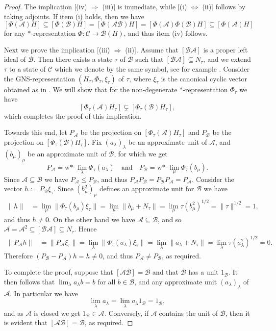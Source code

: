 \documentclass[11pt, draft]{amsart}
\numberwithin{equation}{section}
\theoremstyle{plain}
\theoremstyle{definition}
\theoremstyle{remark}
\newcommand{\A}{{\mathcal{A}}}
\newcommand{\B}{{\mathcal{B}}}
\newcommand{\C}{{\mathcal{C}}}
\def\la{\lambda}
\newcommand{\qand}{\quad\text{and}\quad}
\begin{document}
\begin{proof}
The implication [(iv) $\Rightarrow$ (iii)] is immediate, while [(i) $\Leftrightarrow$ (ii)] follows by taking adjoints.
If item (i) holds, then we have
\[
[\Phi(\A) H] \subseteq [\Phi(\B) H] = [\Phi(\A \B) H] = [\Phi(\A) \Phi(\B) H] \subseteq [\Phi(\A) H]
\]
for any $*$-representation $\Phi \colon \C \to \B(H)$, and thus item (iv) follows. 

Next we prove the implication [(iii) $\Rightarrow$ (ii)]. Assume that $[\B \A]$ is a proper left ideal of $\B$.
Then there exists a state $\tau$ of $\B$ such that $[\B \A] \subseteq N_\tau$, and we extend $\tau$ to a state of $\C$ which we denote by the same symbol, see for example \cite[Theorem 5.3.3 and Theorem 3.3.8]{Mur90}.
Consider the GNS-representation $(H_\tau, \Phi_\tau, \xi_\tau)$ of $\tau$, where $\xi_\tau$ is the canonical cyclic vector obtained as in \cite[Theorem 5.1.1]{Mur90}.
We will show that for the non-degenerate $*$-representation $\Phi_\tau$ we have
\[
[\Phi_\tau(\A) H_\tau] \subsetneq [\Phi_\tau(\B) H_{\tau}],
\]
which completes the proof of this implication.

Towards this end, let $P_\A$ be the projection on $[\Phi_\tau(\A) H_\tau]$ and $P_\B$ be the projection on $[\Phi_\tau(\B) H_\tau]$.
Fix $(a_\la)_\la$ be an approximate unit of $\A$, and $(b_\mu)_\mu$ be an approximate unit of $\B$, for which we get
\[
P_\A = \text{w*-}\lim_\la \Phi_{\tau}(a_\la)
\qand
P_\B = \text{w*-}\lim_\mu \Phi_{\tau}(b_\mu).
\]
Since $\A \subseteq \B$ we have $P_\A \leq P_\B$, and thus $P_\A P_\B = P_\B P_\A = P_\A$.
Consider the vector $h:= P_\B \xi_\tau$.
Since $(b_\mu^2)_\mu$ defines an approximate unit for $\B$ we have
\begin{align*}
\|h\| 
& = \lim_\mu \|\Phi_\tau(b_\mu)\xi_\tau\| 
= \lim_\mu \|b_\mu + N_\tau\| 
= \lim_\mu \tau(b_\mu^2)^{1/2} 
= \|\tau\|^{1/2} = 1,
\end{align*}
and thus $h \neq 0$.
On the other hand we have $\A \subseteq \B$, and so $\A = \A^2 \subseteq [\B \A] \subseteq N_\tau$. 
Hence
\begin{align*}
\|P_\A h\| 
& = \| P_\A \xi_\tau\| 
= \lim_\la \|\Phi_\tau(a_\la) \xi_\tau\| 
= \lim_\la \|a_\la+N_\tau\| 
= \lim_\la \tau(a_\la^2)^{1/2} = 0.
\end{align*}
Therefore $(P_\B - P_\A) h = h \neq 0$, and thus $P_\A \neq P_\B$, as required.

To complete the proof, suppose that $[\A \B] = \B$ and that $\B$ has a unit $1_{\B}$.
It then follows that $\lim_\la a_\la b = b$ for all $b \in \B$, and any approximate unit $(a_\la)_\la$ of $\A$.
In particular we have 
\[
\lim_\la a_\la = \lim_\la a_\la 1_{\B} = 1_{\B},
\]
and as $\A$ is closed we get $1_{\B} \in \A$. 
Conversely, if $\A$ contains the unit of $\B$, then it is evident that $[\A \B] = \B$, as required.
\end{proof}
\end{document}
